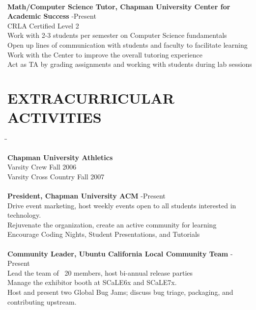 \documentclass{res}
\begin{document}
\begin{resume}
\begin{tabbing}
\\

   {\bf Math/Computer Science Tutor, Chapman University Center for Academic Success} \> -Present\\
	 CRLA Certified Level 2\\
	 Work with 2-3 students per semester on Computer Science fundamentals\\
	 Open up lines of communication with students and faculty to facilitate learning\\
	 Work with the Center to improve the overall tutoring experience\\
	 Act as TA by grading assignments and working with students during lab sessions\\
	\end{tabbing}
 
   \vspace{-0.3in}	
\section{EXTRACURRICULAR ACTIVITIES}          
	\vspace{-5pt}
   \begin{tabbing}
   \hspace{2.5in}\= \hspace{3.45in}\= \kill %

    {\bf Chapman University Athletics}\\
	Varsity Crew \> \>\hspace{0.2in}Fall 2006\\
	Varsity Cross Country \> \>\hspace{0.2in}Fall 2007\\

\\

    {\bf President, Chapman University ACM} \> -Present\\
	 Drive event marketing, host weekly events open to all students interested in technology.\\
	 Rejuvenate the organization, create an active community for learning \\
	 Encourage Coding Nights, Student Presentations, and Tutorials\\

\\

    {\bf Community Leader, Ubuntu California Local Community Team} \> -Present\\
	Lead the team of ~20 members, host bi-annual release parties \\
	Manage the exhibitor booth at SCaLE6x and SCaLE7x. \\
	Host and present two Global Bug Jams; discuss bug triage, packaging, and contributing upstream. \\


\end{tabbing}
\end{resume}
\end{document}
